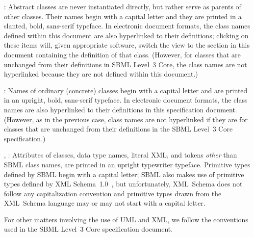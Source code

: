 \begin{description}
  
\item {}: Abstract classes are never instantiated directly, but rather serve as parents of other classes. Their names begin with a capital letter and they are printed in a slanted, bold, sans-serif typeface.  In electronic document formats, the class names defined within this document are also hyperlinked to their definitions; clicking on these items will, given appropriate software, switch the view to the section in this document containing the definition of that class.  (However, for classes that are unchanged from their definitions in SBML Level~3 Core, the class names are not hyperlinked because they are not defined within this document.)

\item {}: Names of ordinary (concrete) classes begin with a capital letter and are printed in an upright, bold, sans-serif typeface.  In electronic document formats, the class names are also hyperlinked to their definitions in this specification document. (However, as in the previous case, class names are not hyperlinked if they are for classes that are unchanged from their definitions in the SBML Level~3 Core specification.)

\item {}, : Attributes of classes, data type names, literal XML, and tokens \emph{other} than SBML class names, are printed in an upright typewriter typeface.  Primitive types defined by SBML begin with a capital letter; SBML also makes use of primitive types defined by XML Schema~1.0~\citep{biron:2000,fallside:2000,thompson:2000}, but unfortunately, XML~Schema does not follow any capitalization convention and primitive types drawn from the XML~Schema language may or may not start with a capital letter.

\end{description}

For other matters involving the use of UML and XML, we follow the conventions used in the SBML Level~3 Core specification document.  




